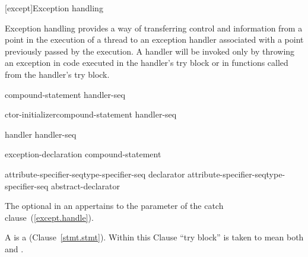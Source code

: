 [except]{Exception handling}%


%

\pnum
Exception handling provides a way of transferring control and information
from a point in the execution of a thread to an exception handler
associated with a point previously passed by the execution.
A handler will be invoked only by throwing an exception
in code executed in the handler's try block
or in functions called from the handler's try block.

%
%
\begin{bnf}
\br
     compound-statement handler-seq
\end{bnf}

%
%
\begin{bnf}
\br
     ctor-initializer\opt compound-statement handler-seq
\end{bnf}

\begin{bnf}
\br
    handler handler-seq\opt
\end{bnf}

%
%
\begin{bnf}
\br
     exception-declaration \terminal{)} compound-statement
\end{bnf}

\begin{bnf}
\br
    attribute-specifier-seq\opt type-specifier-seq declarator\br
    attribute-specifier-seq\opt type-specifier-seq abstract-declarator\opt\br
\end{bnf}

The optional  in an 
appertains to the parameter of the catch clause~(\ref{except.handle}).

\pnum
{}%
%
%
%
A  is a  (Clause~\ref{stmt.stmt}).
\enternote Within this Clause
``try block'' is taken to mean both  and
. \exitnote

